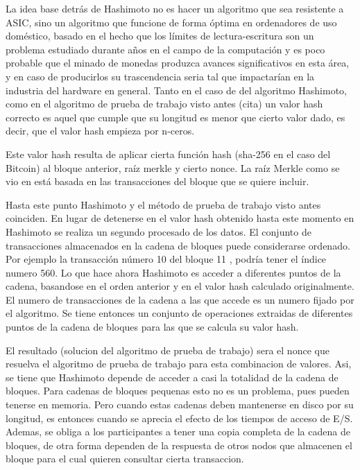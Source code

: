  La idea base detrás de Hashimoto no es hacer un algoritmo que sea resistente a ASIC, sino un algoritmo que funcione de forma óptima en ordenadores de uso doméstico, basado en el hecho que los límites de lectura-escritura son un problema estudiado durante años en el campo de la computación y es poco probable que el minado de monedas produzca avances significativos en esta área, y en caso de producirlos su trascendencia seria tal que impactarían en la industria del hardware en general.
Tanto en el caso de del algoritmo Hashimoto, como en el algoritmo de prueba de trabajo visto antes (cita) un valor hash correcto es aquel que cumple que su longitud es menor que cierto valor dado, es decir, que el valor hash empieza por n-ceros.

Este valor hash resulta de aplicar cierta función hash (sha-256 en el caso del Bitcoin) al bloque anterior, raíz merkle y cierto nonce. La raíz Merkle como se vio en \label{merkle} está basada en las transacciones del bloque que se quiere incluir. 


Hasta este punto Hashimoto y el método de prueba de trabajo visto antes coinciden. En lugar de detenerse en el valor hash obtenido hasta este momento en Hashimoto se realiza un segundo procesado de los datos. El conjunto de transacciones almacenados en la cadena de bloques puede considerarse ordenado. Por ejemplo la transacción número 10 del bloque 11 , podría tener el índice numero 560. Lo que hace ahora Hashimoto es acceder a diferentes puntos de la cadena, basandose en el orden anterior y en el valor hash calculado originalmente. El numero de transacciones de la cadena a las que accede es un numero fijado por el algoritmo. Se tiene entonces un conjunto de operaciones extraidas de diferentes puntos de la cadena de bloques para las que se calcula su valor hash.


El resultado (solucion del algoritmo de prueba de trabajo) sera el nonce que resuelva el algoritmo de prueba de trabajo para esta combinacion de valores. Asi, se tiene que Hashimoto depende de acceder a casi la totalidad de la cadena de bloques. Para cadenas de bloques pequenas esto no es un problema, pues pueden tenerse en memoria. Pero cuando estas cadenas deben mantenerse en disco por su longitud, es entonces cuando se aprecia el efecto de los tiempos de acceso de E/S. Ademas, se obliga a los participantes a tener una copia completa de la cadena de bloques, de otra forma dependen de la respuesta de otros nodos que almacenen el bloque para el cual quieren consultar cierta transaccion. 


